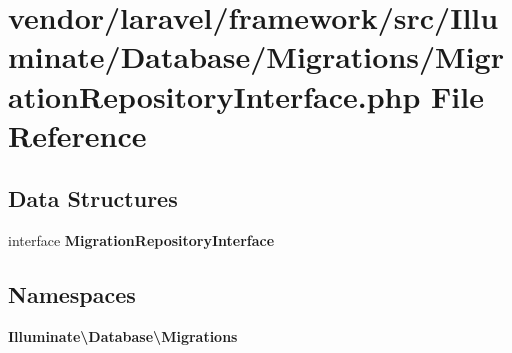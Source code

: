 \section{vendor/laravel/framework/src/\+Illuminate/\+Database/\+Migrations/\+Migration\+Repository\+Interface.php File Reference}
\label{_migration_repository_interface_8php}
\subsection*{Data Structures}
\begin{DoxyCompactItemize}
\item 
interface {\bf Migration\+Repository\+Interface}
\end{DoxyCompactItemize}
\subsection*{Namespaces}
\begin{DoxyCompactItemize}
\item 
 {\bf Illuminate\textbackslash{}\+Database\textbackslash{}\+Migrations}
\end{DoxyCompactItemize}
